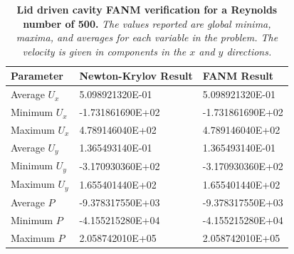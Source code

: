 \begin{table}[h!]
  \begin{center}
    \begin{tabular}{lll}\hline\hline
      \multicolumn{1}{l}{Parameter}& 
      \multicolumn{1}{l}{Newton-Krylov Result}&
      \multicolumn{1}{l}{FANM Result}\\
      \hline
      Average $U_x$ & 5.098921320E-01 & 5.098921320E-01 \\
      Minimum $U_x$ & -1.731861690E+02 & -1.731861690E+02 \\
      Maximum $U_x$ & 4.789146040E+02 & 4.789146040E+02 \\
      \hline
      Average $U_y$ & 1.365493140E-01 & 1.365493140E-01 \\
      Minimum $U_y$ & -3.170930360E+02 & -3.170930360E+02 \\
      Maximum $U_y$ & 1.655401440E+02 & 1.655401440E+02 \\
      \hline
      Average $P$ & -9.378317550E+03 & -9.378317550E+03 \\
      Minimum $P$ & -4.155215280E+04 & -4.155215280E+04 \\
      Maximum $P$ & 2.058742010E+05 & 2.058742010E+05 \\
      \hline\hline
    \end{tabular}
  \end{center}
  \caption{\textbf{Lid driven cavity FANM verification for a Reynolds
      number of 500.} \textit{The values reported are global minima,
      maxima, and averages for each variable in the problem. The
      velocity is given in components in the $x$ and $y$ directions.}}
  \label{tab:driven_re500_results}
\end{table}

